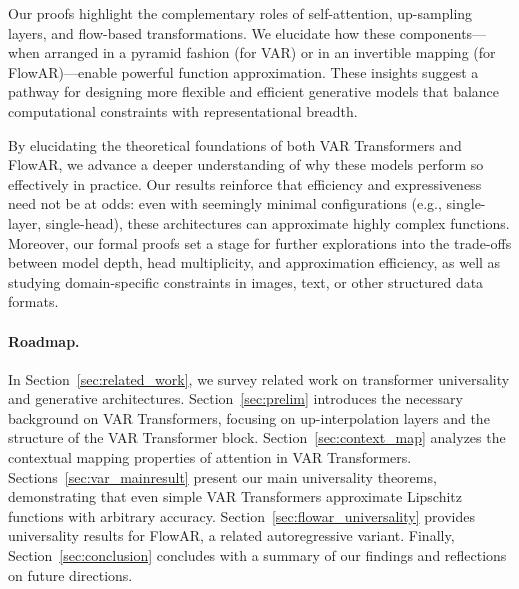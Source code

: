 Our proofs highlight the complementary roles of self-attention, up-sampling layers, and flow-based transformations. We elucidate how these components—when arranged in a pyramid fashion (for VAR) or in an invertible mapping (for FlowAR)—enable powerful function approximation. These insights suggest a pathway for designing more flexible and efficient generative models that balance computational constraints with representational breadth.

By elucidating the theoretical foundations of both VAR Transformers and FlowAR, we advance a deeper understanding of why these models perform so effectively in practice. Our results reinforce that efficiency and expressiveness need not be at odds: even with seemingly minimal configurations (e.g., single-layer, single-head), these architectures can approximate highly complex functions. Moreover, our formal proofs set a stage for further explorations into the trade-offs between model depth, head multiplicity, and approximation efficiency, as well as studying domain-specific constraints in images, text, or other structured data formats.

\paragraph{Roadmap.} 
In Section~\ref{sec:related_work}, we survey related work on transformer universality and generative architectures. Section~\ref{sec:prelim} introduces the necessary background on VAR Transformers, focusing on up-interpolation layers and the structure of the VAR Transformer block. Section~\ref{sec:context_map} analyzes the contextual mapping properties of attention in VAR Transformers. Sections~\ref{sec:var_mainresult} present our main universality theorems, demonstrating that even simple VAR Transformers approximate Lipschitz functions with arbitrary accuracy. Section~\ref{sec:flowar_universality} provides universality results for FlowAR, a related autoregressive variant. Finally, Section~\ref{sec:conclusion} concludes with a summary of our findings and reflections on future directions. 
